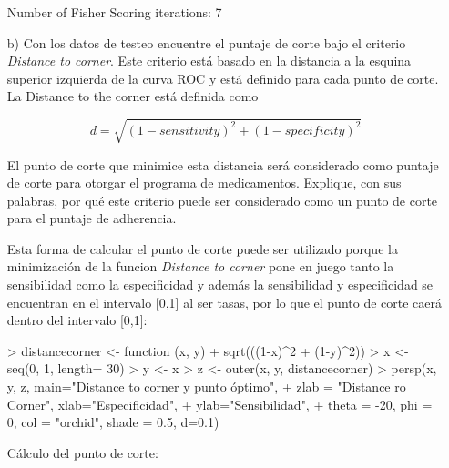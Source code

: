 \documentclass[11pt,onside]{article}
\begin{document}
\begin{itemize}
\begin{Schunk}
\begin{Soutput}
Number of Fisher Scoring iterations: 7
\end{Soutput}
\end{Schunk}

\item[b)] Con los datos de testeo encuentre el puntaje de corte bajo el criterio \textit{Distance to corner}. Este criterio está basado en la distancia a la esquina superior izquierda de la curva ROC y está definido para cada punto de corte. La Distance to the corner está definida como

$$d=\sqrt{(1-sensitivity)^2+(1-specificity)^2}$$

El punto de corte que minimice esta distancia será considerado como puntaje de corte para otorgar el programa de medicamentos. Explique, con sus palabras, por qué este criterio puede ser considerado como un punto de corte para el puntaje de adherencia.


Esta forma de calcular el punto de corte puede ser utilizado porque la minimización de la funcion \textit{Distance to corner} pone en juego tanto la sensibilidad como la especificidad y además la sensibilidad y especificidad se encuentran en el intervalo [0,1] al ser tasas, por lo que el punto de corte caerá dentro del intervalo [0,1]:


\begin{Schunk}
\begin{Sinput}
> distancecorner <- function (x, y) {
+    sqrt(((1-x)^2 + (1-y)^2)) }
> x <- seq(0, 1, length= 30)
> y <- x
> z <- outer(x, y, distancecorner)
> persp(x, y, z, main="Distance to corner y punto óptimo",
+ zlab = "Distance ro Corner", xlab="Especificidad", 
+ ylab="Sensibilidad",
+ theta = -20, phi = 0, col = "orchid", shade = 0.5, d=0.1)
\end{Sinput}
\end{Schunk}


Cálculo del punto de corte:


\end{itemize}
\end{document}
